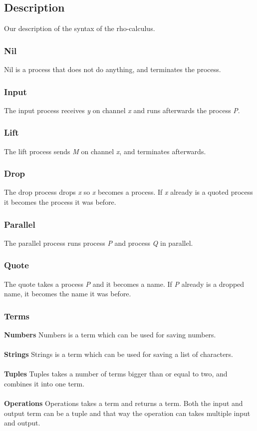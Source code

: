 \subsection{Description}
Our description of the syntax of the rho-calculus.

\subsubsection{Nil}
Nil is a process that does not do anything, and terminates the process.

\subsubsection{Input}
The input process receives \textit{y} on channel \textit{x} and runs afterwards the process \textit{P}.

\subsubsection{Lift}
The lift process sends \textit{M} on channel \textit{x}, and terminates afterwards.

\subsubsection{Drop}
The drop process drops \textit{x} so \textit{x} becomes a process. If \textit{x} already is a quoted process it becomes the process it was before.

\subsubsection{Parallel}
The parallel process runs process \textit{P} and process \textit{Q} in parallel.

\subsubsection{Quote}
The quote takes a process \textit{P} and it becomes a name. If \textit{P} already is a dropped name, it becomes the name it was before.

\subsubsection{Terms}
\textbf{Numbers} 
Numbers is a term which can be used for saving numbers.
\\\\
\textbf{Strings}
Strings is a term which can be used for saving a list of characters.
\\\\
\textbf{Tuples}
Tuples takes a number of terms bigger than or equal to two, and combines it into one term.
\\\\
\textbf{Operations}
Operations takes a term and returns a term. Both the input and output term can be a tuple and that way the operation can takes multiple input and output.
